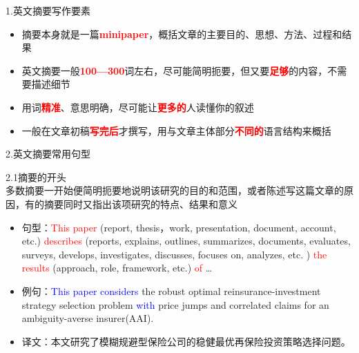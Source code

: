 \documentclass[13pt]{ctexbeamer}
\newcommand{\red}[1]{\textcolor{red}{#1}}
\newcommand{\blue}[1]{\textcolor{blue}{#1}}
\begin{document}
\begin{frame}{1.英文摘要写作要素}
    \setlength{\baselineskip}{23pt}
    \begin{itemize}

        \item 摘要本身就是一篇\red{\textbf{minipaper}}，概括文章的主要目的、思想、方法、过程和结果
        \item 英文摘要一般\red{\textbf{100—300}}词左右，尽可能简明扼要，但又要\red{\textbf{足够}}的内容，不需要描述细节
        \item 用词\red{\textbf{精准}}、意思明确，尽可能让\red{\textbf{更多的}}人读懂你的叙述
        \item 一般在文章初稿\red{\textbf{写完后}}才撰写，用与文章主体部分\red{\textbf{不同的}}语言结构来概括
    \end{itemize}
    \vspace{20pt}


\end{frame}

\begin{frame}{2.英文摘要常用句型}

    2.1摘要的开头
    \\
    \renewcommand{\baselinestretch}{1.3}
    多数摘要一开始便简明扼要地说明该研究的目的和范围，或者陈述写这篇文章的原因，有的摘要同时又指出该项研究的特点、结果和意义\\

    \begin{itemize}
        \item
        句型：\red{This paper} (report, thesis，work, presentation, document, account, etc.) \red{describes }(reports, explains, outlines, summarizes,
        documents, evaluates, surveys, develops, investigates, discusses,
        focuses on, analyzes, etc. )  \red{the results} (approach, role, framework,
        etc.) \red{of} …
        \item
        例句：\blue{This paper considers }the robust optimal reinsurance-investment strategy selection problem  \blue{with} price jumps and correlated claims for an ambiguity-averse insurer(AAI).

        \item
        译文：本文研究了模糊规避型保险公司的稳健最优再保险投资策略选择问题。

    \end{itemize}

    \vspace{15pt}

\end{frame}
\end{document}
